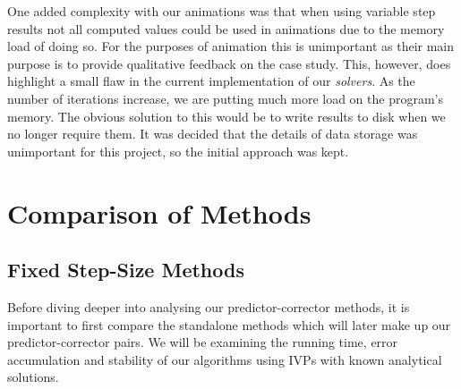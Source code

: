 \documentclass[12pt, twoside]{report}
\theoremstyle{plain}
\theoremstyle{definition}
\theoremstyle{definition}
\begin{document}
        One added complexity with our animations was that when using variable
        step results not all computed values could be used in animations due to
        the memory load of doing so. For the purposes of animation this is
        unimportant as their main purpose is to provide qualitative feedback on
        the case study. This, however, does highlight a small flaw in the 
        current implementation of our \textit{solvers}. As the number of 
        iterations increase, we are putting much more load on the program's 
        memory. The obvious solution to this would be to write results to disk
        when we no longer require them. It was decided that the details of data
        storage was unimportant for this project, so the initial approach 
        was kept.


\chapter{Comparison of Methods}
\label{4_comparison}
    
    \section{Fixed Step-Size Methods}
    \label{4_fixed}
        Before diving deeper into analysing our predictor-corrector methods, it
        is important to first compare the standalone methods which will later
        make up our predictor-corrector pairs. We will be examining the 
        running time, error accumulation and stability of our algorithms using 
        IVPs with known analytical solutions.
\end{document}
